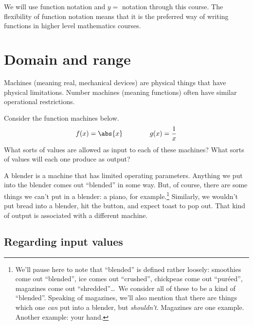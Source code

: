 We will use function notation and $y =$ notation through this course. The flexibility of function notation means that it is the preferred way of writing functions in higher level mathematics courses.


\section{Domain and range}
\label{cref:domandrange}



Machines (meaning real, mechanical devices) are physical things that have physical limitations. Number machines (meaning functions) often have similar operational restrictions.

\begin{boxedexplore}
Consider the function machines below.
\[f(x) = \abs{x} \qquad\qquad g(x)=\frac{1}{x}\]
What sorts of values are allowed as input to each of these machines? What sorts of values will each one produce as output?
\end{boxedexplore} %

A blender is a machine that has limited operating parameters. Anything we put into the blender comes out ``blended'' in some way. But, of course, there are some things we can't put in a blender: a piano, for example.\footnote{We'll pause here to note that ``blended'' is defined rather loosely: smoothies come out ``blended'', ice comes out ``crushed'', chickpeas come out ``pur\'eed'', magazines come out ``shredded''\ldots\ We consider all of these to be a kind of ``blended''. Speaking of magazines, we'll also mention that there are things which one \textit{can} put into a blender, but \textit{shouldn't}. Magazines are one example. Another example: your hand.} Similarly, we wouldn't put bread into a  blender, hit the button, and expect toast to pop out. That kind of output is associated with a different machine.

\subsection{Regarding input values}


